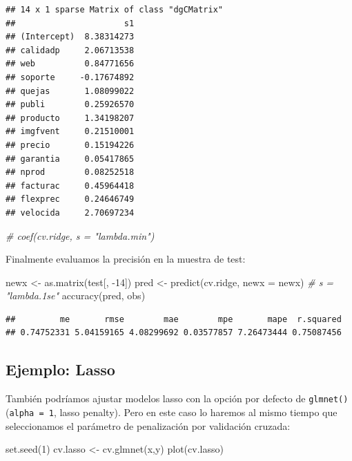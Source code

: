 \documentclass[
]{book}
\newenvironment{Shaded}{\begin{snugshade}}{\end{snugshade}}
\newcommand{\AttributeTok}[1]{\textcolor[rgb]{0.77,0.63,0.00}{#1}}
\newcommand{\CommentTok}[1]{\textcolor[rgb]{0.56,0.35,0.01}{\textit{#1}}}
\newcommand{\DecValTok}[1]{\textcolor[rgb]{0.00,0.00,0.81}{#1}}
\newcommand{\FunctionTok}[1]{\textcolor[rgb]{0.00,0.00,0.00}{#1}}
\newcommand{\NormalTok}[1]{#1}
\newcommand{\OtherTok}[1]{\textcolor[rgb]{0.56,0.35,0.01}{#1}}
\newcommand{\SpecialCharTok}[1]{\textcolor[rgb]{0.00,0.00,0.00}{#1}}
\theoremstyle{break}
\theoremstyle{definition}
\theoremstyle{definition}
\theoremstyle{definition}
\theoremstyle{definition}
\theoremstyle{remark}
\begin{document}
\begin{verbatim}
## 14 x 1 sparse Matrix of class "dgCMatrix"
##                      s1
## (Intercept)  8.38314273
## calidadp     2.06713538
## web          0.84771656
## soporte     -0.17674892
## quejas       1.08099022
## publi        0.25926570
## producto     1.34198207
## imgfvent     0.21510001
## precio       0.15194226
## garantia     0.05417865
## nprod        0.08252518
## facturac     0.45964418
## flexprec     0.24646749
## velocida     2.70697234
\end{verbatim}

\begin{Shaded}
\begin{Highlighting}[]
\CommentTok{\# coef(cv.ridge, s = "lambda.min")}
\end{Highlighting}
\end{Shaded}

Finalmente evaluamos la precisión en la muestra de test:

\begin{Shaded}
\begin{Highlighting}[]
\NormalTok{newx }\OtherTok{\textless{}{-}} \FunctionTok{as.matrix}\NormalTok{(test[, }\SpecialCharTok{{-}}\DecValTok{14}\NormalTok{])}
\NormalTok{pred }\OtherTok{\textless{}{-}} \FunctionTok{predict}\NormalTok{(cv.ridge, }\AttributeTok{newx =}\NormalTok{ newx) }\CommentTok{\# s = "lambda.1se"}
\FunctionTok{accuracy}\NormalTok{(pred, obs)}
\end{Highlighting}
\end{Shaded}

\begin{verbatim}
##         me       rmse        mae        mpe       mape  r.squared 
## 0.74752331 5.04159165 4.08299692 0.03577857 7.26473444 0.75087456
\end{verbatim}

\hypertarget{ejemplo-lasso}{%
\subsection{Ejemplo: Lasso}\label{ejemplo-lasso}}

También podríamos ajustar modelos lasso con la opción por defecto de \texttt{glmnet()} (\texttt{alpha\ =\ 1}, lasso penalty).
Pero en este caso lo haremos al mismo tiempo que seleccionamos el parámetro de penalización por validación cruzada:

\begin{Shaded}
\begin{Highlighting}[]
\FunctionTok{set.seed}\NormalTok{(}\DecValTok{1}\NormalTok{)}
\NormalTok{cv.lasso }\OtherTok{\textless{}{-}} \FunctionTok{cv.glmnet}\NormalTok{(x,y)}
\FunctionTok{plot}\NormalTok{(cv.lasso)}
\end{Highlighting}
\end{Shaded}
\end{document}
